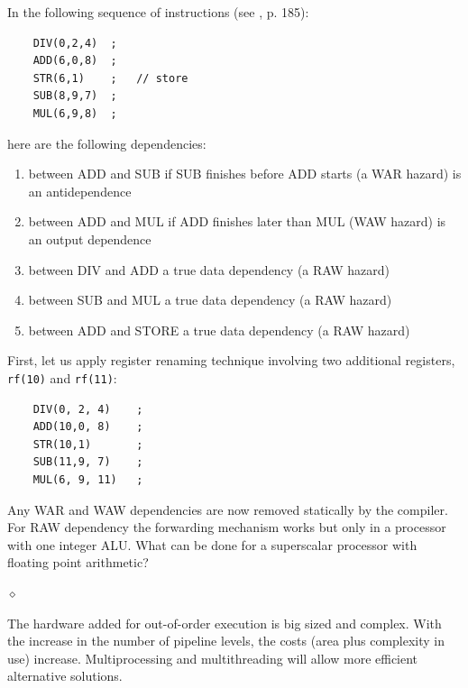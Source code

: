 \begin{exemplu}\label{warwaw}
In the following sequence of instructions (see \citep{Patterson05}, p. 185):
\begin{verbatim}
    DIV(0,2,4)  ;
    ADD(6,0,8)  ;
    STR(6,1)    ;   // store
    SUB(8,9,7)  ;
    MUL(6,9,8)  ;
\end{verbatim}
here are the following dependencies:
\begin{enumerate}
    \item between ADD and SUB if SUB finishes before ADD starts (a WAR hazard) is an antidependence
    \item between ADD and MUL if ADD finishes later than MUL (WAW hazard) is an output dependence
    \item between DIV and ADD a true data dependency (a RAW hazard)
    \item between SUB and MUL a true data dependency (a RAW hazard)
    \item between ADD and STORE a true data dependency (a RAW hazard)
\end{enumerate}
First, let us apply register renaming technique involving two additional registers, {\tt rf(10)} and {\tt rf(11)}:
\begin{verbatim}
    DIV(0, 2, 4)    ;
    ADD(10,0, 8)    ;
    STR(10,1)       ;
    SUB(11,9, 7)    ;
    MUL(6, 9, 11)   ;
\end{verbatim}
Any WAR and WAW dependencies are now removed statically by the compiler. For RAW dependency the forwarding mechanism works but only in a processor with one integer ALU. What can be done for a superscalar processor with floating point arithmetic?

$\diamond$
\end{exemplu}

The hardware added for out-of-order execution is big sized and complex. With the increase in the number of pipeline levels, the costs (area plus complexity in use) increase. Multiprocessing and multithreading will allow more efficient alternative solutions.

